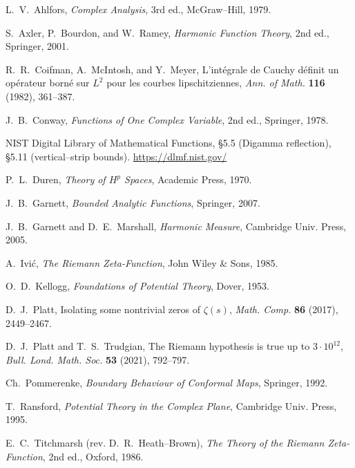 \documentclass[11pt]{article}
\numberwithin{equation}{section}
\theoremstyle{remark}
\begin{document}
\begin{thebibliography}{99}

L.~V.~Ahlfors, \emph{Complex Analysis}, 3rd ed., McGraw--Hill, 1979.

S.~Axler, P.~Bourdon, and W.~Ramey, \emph{Harmonic Function Theory}, 2nd ed., Springer, 2001.

R.~R.~Coifman, A.~McIntosh, and Y.~Meyer,
L’int\'egrale de Cauchy d\'efinit un op\'erateur born\'e sur $L^2$ pour les courbes lipschitziennes,
\emph{Ann. of Math.} \textbf{116} (1982), 361--387.

J.~B.~Conway, \emph{Functions of One Complex Variable}, 2nd ed., Springer, 1978.

NIST Digital Library of Mathematical Functions, \S5.5 (Digamma reflection), \S5.11 (vertical--strip bounds).
\url{https://dlmf.nist.gov/}

P.~L.~Duren, \emph{Theory of $H^p$ Spaces}, Academic Press, 1970.

J.~B.~Garnett, \emph{Bounded Analytic Functions}, Springer, 2007.

J.~B.~Garnett and D.~E.~Marshall, \emph{Harmonic Measure}, Cambridge Univ. Press, 2005.

A.~Ivi\'c, \emph{The Riemann Zeta-Function}, John Wiley \& Sons, 1985.

O.~D.~Kellogg, \emph{Foundations of Potential Theory}, Dover, 1953.

D.~J.~Platt, Isolating some nontrivial zeros of $\zeta(s)$, \emph{Math. Comp.} \textbf{86} (2017), 2449--2467.

D.~J.~Platt and T.~S.~Trudgian, The Riemann hypothesis is true up to $3\cdot 10^{12}$,
\emph{Bull. Lond. Math. Soc.} \textbf{53} (2021), 792--797.

Ch.~Pommerenke, \emph{Boundary Behaviour of Conformal Maps}, Springer, 1992.

T.~Ransford, \emph{Potential Theory in the Complex Plane}, Cambridge Univ. Press, 1995.

E.~C.~Titchmarsh (rev. D.~R.~Heath--Brown), \emph{The Theory of the Riemann Zeta-Function}, 2nd ed., Oxford, 1986.

\end{thebibliography}
\end{document}
